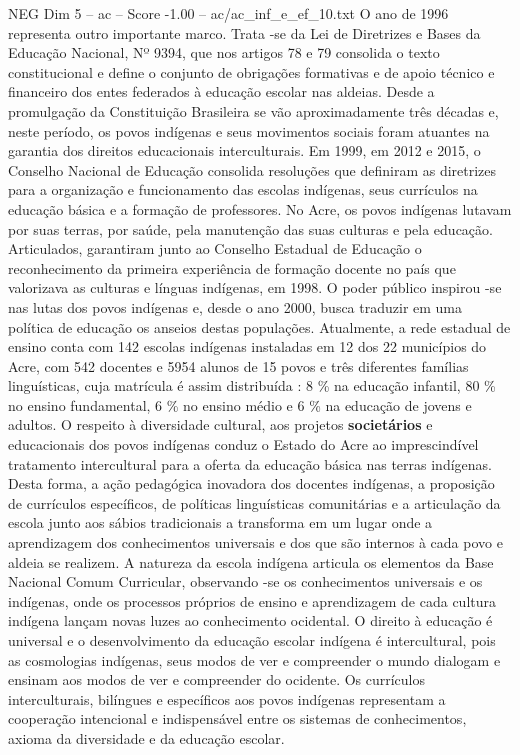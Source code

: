 \begin{textsample}{NEG Dim 5 – ac – Score -1.00 – ac/ac\_inf\_e\_ef\_10.txt}
O ano de 1996 representa outro importante marco.
Trata -se da Lei de Diretrizes e Bases da Educação Nacional, Nº 9394, que nos artigos 78 e 79 consolida o texto constitucional e define o conjunto de obrigações formativas e de apoio técnico e financeiro dos entes federados à educação escolar nas aldeias.
Desde a promulgação da Constituição Brasileira se vão aproximadamente três décadas e, neste período, os povos indígenas e seus movimentos sociais foram atuantes na garantia dos direitos educacionais interculturais.
Em 1999, em 2012 e 2015, o Conselho Nacional de Educação consolida resoluções que definiram as diretrizes para a organização e funcionamento das escolas indígenas, seus currículos na educação básica e a formação de professores.
No Acre, os povos indígenas lutavam por suas terras, por saúde, pela manutenção das suas culturas e pela educação.
Articulados, garantiram junto ao Conselho Estadual de Educação o reconhecimento da primeira experiência de formação docente no país que valorizava as culturas e línguas indígenas, em 1998.
O poder público inspirou -se nas lutas dos povos indígenas e, desde o ano 2000, busca traduzir em uma política de educação os anseios destas populações.
Atualmente, a rede estadual de ensino conta com 142 escolas indígenas instaladas em 12 dos 22 municípios do Acre, com 542 docentes e 5954 alunos de 15 povos e três diferentes famílias linguísticas, cuja matrícula é assim distribuída : 8 \% na educação infantil, 80 \% no ensino fundamental, 6 \% no ensino médio e 6 \% na educação de jovens e adultos.
O respeito à diversidade cultural, aos projetos \textbf{societários} e educacionais dos povos indígenas conduz o Estado do Acre ao imprescindível tratamento intercultural para a oferta da educação básica nas terras indígenas.
Desta forma, a ação pedagógica inovadora dos docentes indígenas, a proposição de currículos específicos, de políticas linguísticas comunitárias e a articulação da escola junto aos sábios tradicionais a transforma em um lugar onde a aprendizagem dos conhecimentos universais e dos que são internos à cada povo e aldeia se realizem.
A natureza da escola indígena articula os elementos da Base Nacional Comum Curricular, observando -se os conhecimentos universais e os indígenas, onde os processos próprios de ensino e aprendizagem de cada cultura indígena lançam novas luzes ao conhecimento ocidental.
O direito à educação é universal e o desenvolvimento da educação escolar indígena é intercultural, pois as cosmologias indígenas, seus modos de ver e compreender o mundo dialogam e ensinam aos modos de ver e compreender do ocidente.
Os currículos interculturais, bilíngues e específicos aos povos indígenas representam a cooperação intencional e indispensável entre os sistemas de conhecimentos, axioma da diversidade e da educação escolar.

\end{textsample}
